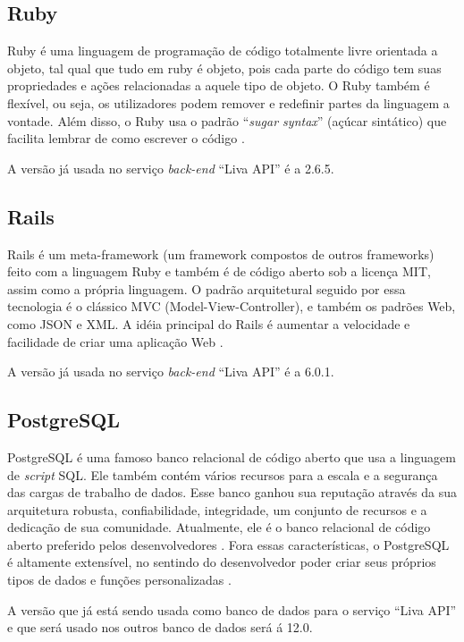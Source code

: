 \subsection{Ruby}

Ruby é uma linguagem de programação de código totalmente livre orientada a objeto, tal qual que tudo em ruby é objeto, pois cada parte do código tem suas propriedades e ações relacionadas a aquele tipo de objeto. O Ruby também é flexível, ou seja, os utilizadores podem remover e redefinir partes da linguagem a vontade. Além disso, o Ruby usa o padrão “\textit{sugar syntax}” (açúcar sintático) que facilita lembrar de como escrever o código \cite{ruby:2019}.

A versão já usada no serviço \textit{back-end} “Liva API” é a 2.6.5.

\subsection{Rails}

Rails é um meta-framework (um framework compostos de outros frameworks) feito com a linguagem Ruby e também é de código aberto sob a licença MIT, assim como a própria linguagem. O padrão arquitetural seguido por essa tecnologia é o clássico MVC (Model-View-Controller), e também os padrões Web, como JSON e XML. A idéia principal do Rails é aumentar a velocidade e facilidade de criar uma aplicação Web \cite{portalgsti:2019}.

A versão já usada no serviço \textit{back-end} “Liva API” é a 6.0.1.

\subsection{PostgreSQL}

PostgreSQL é uma famoso banco relacional de código aberto que usa a linguagem de \textit{script} SQL. Ele também contém vários recursos para a escala e a segurança das cargas de trabalho de dados. Esse banco ganhou sua reputação através da sua arquitetura robusta, confiabilidade, integridade, um conjunto de recursos e a dedicação de sua comunidade. Atualmente, ele é o banco relacional de código aberto preferido pelos desenvolvedores \cite{postgres:2019}.
Fora essas características, o PostgreSQL é altamente extensível, no sentindo do desenvolvedor poder criar seus próprios tipos de dados e funções personalizadas \cite{postgres:2019}.

A versão que já está sendo usada como banco de dados para o serviço “Liva API” e que será usado nos outros banco de dados será á 12.0.

